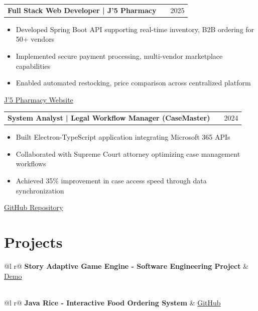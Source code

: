 \documentclass[a4paper,12pt]{article}
\makeatletter
\newenvironment{joblong}[2]
    {
    \begin{tabularx}{\linewidth}{@{}l X r@{}}
    \textbf{#1} & \hfill &  #2 \\[3.75pt]
    \end{tabularx}
    \begin{minipage}[t]{\linewidth}
    \begin{itemize}[nosep,after=\strut, leftmargin=1em, itemsep=3pt,label=--]
    }
    {
    \end{itemize}
    \end{minipage}    
    }
\makeatother
\begin{document}
\begin{joblong}{Full Stack Web Developer | J'5 Pharmacy}{2025}
\item Developed Spring Boot API supporting real-time inventory, B2B ordering for 50+ vendors
\item Implemented secure payment processing, multi-vendor marketplace capabilities
\item Enabled automated restocking, price comparison across centralized platform
\end{joblong}
\href{https://j5pharmacy.com}{J'5 Pharmacy Website}

\begin{joblong}{System Analyst | Legal Workflow Manager (CaseMaster)}{2024}
\item Built Electron-TypeScript application integrating Microsoft 365 APIs
\item Collaborated with Supreme Court attorney optimizing case management workflows
\item Achieved 35\% improvement in case access speed through data synchronization
\end{joblong}
\href{https://github.com/PP-Namias/CaseMaster}{GitHub Repository}
  
\section{Projects}

\begin{tabularx}{\linewidth}{ @{}l r@{} }
\textbf{Story Adaptive Game Engine - Software Engineering Project} & \hfill \href{https://text-adventure-six.vercel.app/}{Demo} \\[3.75pt]
 \\
\end{tabularx}

\begin{tabularx}{\linewidth}{ @{}l r@{} }
\textbf{Java Rice - Interactive Food Ordering System} & \hfill \href{https://github.com/PP-Namias/Java-Rice}{GitHub} \\[3.75pt]
 \\
\end{tabularx}
\end{document}
